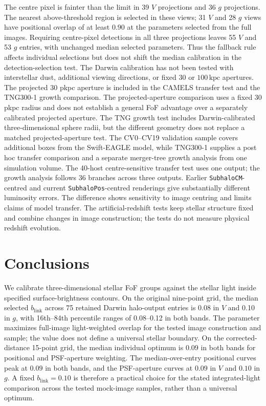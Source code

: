 \documentclass[usenatbib]{mnras}
\begin{document}
The centre pixel is fainter than the limit in 39 $V$ projections and 36
$g$ projections. The nearest above-threshold region is selected in these
views; 31 $V$ and 28 $g$ views have positional overlap of at least $0.90$
at the parameters selected from the full images. Requiring centre-pixel detections
in all three projections leaves 55 $V$ and 53 $g$ entries, with unchanged
median selected parameters. Thus the fallback rule affects individual
selections but does not shift the median calibration in the detection-selection test.
The Darwin calibration has not been tested with interstellar dust,
additional viewing directions, or fixed $30$ or $100\,\mathrm{kpc}$ apertures. The projected 30 pkpc aperture is
included in the CAMELS transfer test and the TNG300-1 growth comparison.
The projected-aperture comparison uses a fixed 30 pkpc radius and does
not establish a general FoF advantage over a separately calibrated
projected aperture. The TNG growth test includes Darwin-calibrated
three-dimensional sphere radii, but the different geometry does not
replace a matched projected-aperture test.
The CV0--CV19 validation sample covers additional boxes from the Swift-EAGLE model,
while TNG300-1 supplies a post hoc transfer comparison and a separate
merger-tree growth analysis from one simulation volume. The 40-host
centre-sensitive transfer test uses one output; the growth analysis follows
36 branches across three outputs. Earlier
\texttt{SubhaloCM}-centred and current \texttt{SubhaloPos}-centred
renderings give substantially different luminosity errors. The difference
shows sensitivity to image centring and limits claims of model transfer.
The artificial-redshift tests keep stellar structure fixed and combine
changes in image construction; the tests do not measure physical redshift
evolution.


\section{Conclusions}
\label{sec:sum}

We calibrate three-dimensional stellar FoF groups against the stellar
light inside specified surface-brightness contours. On the original
nine-point grid, the median selected $b_{\mathrm{link}}$ across 75 retained
Darwin halo-output entries is 0.08 in $V$ and 0.10 in $g$, with 16th--84th
percentile ranges of 0.08--0.12 in both bands. The parameter maximizes
full-image light-weighted overlap for the tested image construction and
sample; the value does not define a universal stellar boundary.
On the corrected-distance 15-point grid, the median individual optimum is
$0.09$ in both bands for positional and PSF-aperture weighting. The
median-over-entry positional curves peak at $0.09$ in both bands, and
the PSF-aperture curves at $0.09$ in $V$ and $0.10$ in $g$. A fixed
$b_{\mathrm{link}}=0.10$ is therefore a practical choice for the stated
integrated-light comparison across the tested mock-image samples, rather than
a universal optimum.
\end{document}
